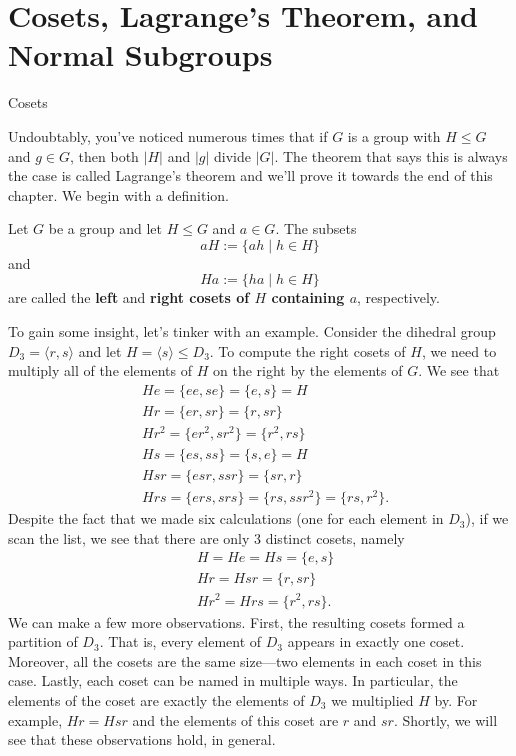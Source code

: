 \chapter{Cosets, Lagrange's Theorem, and Normal Subgroups}
\label{chapter:cosets_lagrange_normal}

\begin{section}{Cosets}\label{sec:Cosets}

Undoubtably, you've noticed numerous times that if $G$ is a group with $H\leq G$ and $g\in G$, then both $|H|$ and $|g|$ divide $|G|$.  The theorem that says this is always the case is called Lagrange's theorem and we'll prove it towards the end of this chapter.  We begin with a definition.

\begin{definition}
Let $G$ be a group and let $H\leq G$ and $a\in G$.  The subsets
\[
aH:=\{ah\mid h\in H\}
\]
and
\[
Ha:=\{ha\mid h\in H\}
\]
are called the \textbf{left} and \textbf{right cosets of $H$ containing $a$}, respectively.
\end{definition}

To gain some insight, let's tinker with an example.  Consider the dihedral group $D_3=\langle r,s\rangle$ and let $H=\langle s\rangle\leq D_3$.  To compute the right cosets of $H$, we need to multiply all of the elements of $H$ on the right by the elements of $G$.  We see that
\begin{align*}
& He =\{ee,se\}=\{e,s\}=H\\
& Hr=\{er,sr\}=\{r,sr\}\\
& Hr^2=\{er^2,sr^2\}=\{r^2,rs\}\\
& Hs=\{es,ss\}=\{s,e\}=H\\
& Hsr=\{esr,ssr\}=\{sr,r\}\\
& Hrs=\{ers,srs\}=\{rs,ssr^2\}=\{rs,r^2\}.
\end{align*}
Despite the fact that we made six calculations (one for each element in $D_3$), if we scan the list, we see that there are only 3 distinct cosets, namely
\begin{align*}
& H=He=Hs=\{e,s\}\\
& Hr=Hsr=\{r,sr\}\\
& Hr^2=Hrs=\{r^2,rs\}.
\end{align*}
We can make a few more observations.  First, the resulting cosets formed a partition of $D_3$.  That is, every element of $D_3$ appears in exactly one coset.  Moreover, all the cosets are the same size---two elements in each coset in this case.  Lastly, each coset can be named in multiple ways.  In particular, the elements of the coset are exactly the elements of $D_3$ we multiplied $H$ by.  For example, $Hr=Hsr$ and the elements of this coset are $r$ and $sr$.  Shortly, we will see that these observations hold, in general.


\end{section}

